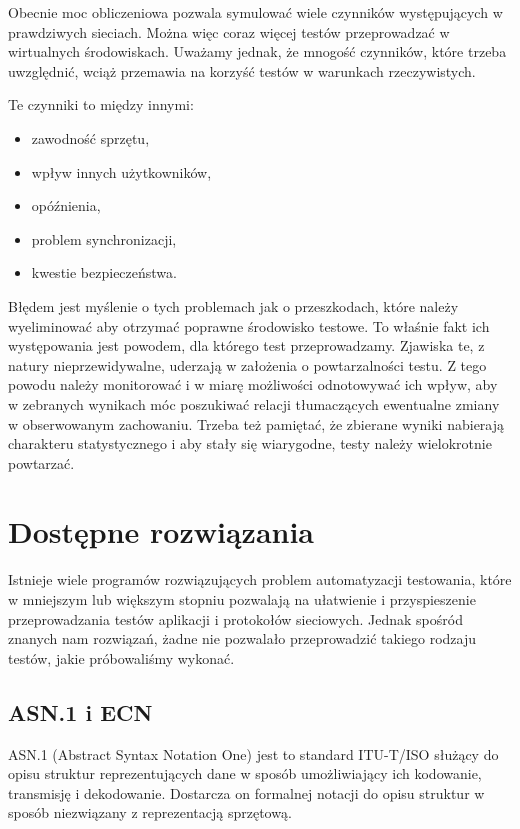 \documentclass[00-praca-magisterska.tex]{subfiles}
\begin{document}
Obecnie moc obliczeniowa pozwala symulować wiele czynników występujących w
prawdziwych sieciach. Można więc coraz więcej testów przeprowadzać w
wirtualnych środowiskach. Uważamy jednak, że mnogość czynników, które trzeba
uwzględnić, wciąż przemawia na korzyść testów w warunkach rzeczywistych.

Te czynniki to między innymi:
\begin{itemize}
\item zawodność sprzętu,
\item wpływ innych użytkowników,
\item opóźnienia,
\item problem synchronizacji,
\item kwestie bezpieczeństwa.
\end{itemize}

Błędem jest myślenie o tych problemach jak o przeszkodach, które należy
wyeliminować aby otrzymać poprawne środowisko testowe. To właśnie fakt ich
występowania jest powodem, dla którego test przeprowadzamy. Zjawiska te, z
natury nieprzewidywalne, uderzają w założenia o powtarzalności testu. Z tego
powodu należy monitorować i w miarę możliwości odnotowywać ich wpływ, aby w
zebranych wynikach móc poszukiwać relacji tłumaczących ewentualne zmiany w
obserwowanym zachowaniu. Trzeba też pamiętać, że zbierane wyniki nabierają
charakteru statystycznego i aby stały się wiarygodne, testy należy wielokrotnie
powtarzać.

\section{Dostępne rozwiązania}

Istnieje wiele programów rozwiązujących problem automatyzacji testowania, które
w mniejszym lub większym stopniu pozwalają na ułatwienie i przyspieszenie
przeprowadzania testów aplikacji i protokołów sieciowych. Jednak spośród znanych
nam rozwiązań, żadne nie pozwalało przeprowadzić takiego rodzaju testów, jakie
próbowaliśmy wykonać.

\subsection{ASN.1 i ECN}
ASN.1 (Abstract Syntax Notation One) jest to standard ITU-T/ISO służący do opisu
struktur reprezentujących dane w sposób umożliwiający ich kodowanie, transmisję
i dekodowanie. Dostarcza on formalnej notacji do opisu struktur w sposób
niezwiązany z reprezentacją sprzętową.
\end{document}
